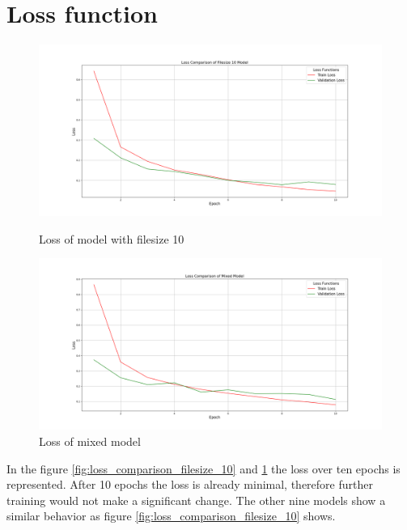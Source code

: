\documentclass{article}
\begin{document}
\section{Loss function}

\begin{figure}[h!]
    \centering
    \begin{minipage}{0.7\textwidth}
        \centering
        \includegraphics[width=1\linewidth]{loss_comparison_filesize_10.png}
        \caption{Loss of model with filesize 10}
        \label{fig:loss_comparison_filesize_10}
    \end{minipage}\hfill
    \begin{minipage}{0.7\textwidth}
        \centering
        \includegraphics[width=1\linewidth]{loss_comparison_mixed.png}
        \caption{Loss of mixed model}
        \label{fig:loss_comparison_filesize_mixed}
    \end{minipage}
\end{figure}

\noindent
In the figure \ref{fig:loss_comparison_filesize_10} and \ref{fig:loss_comparison_filesize_mixed} the loss over ten epochs is represented. After 10 epochs the loss is already minimal, therefore further training would not make a significant change. The other nine models show a similar behavior as figure \ref{fig:loss_comparison_filesize_10} shows.
\end{document}
